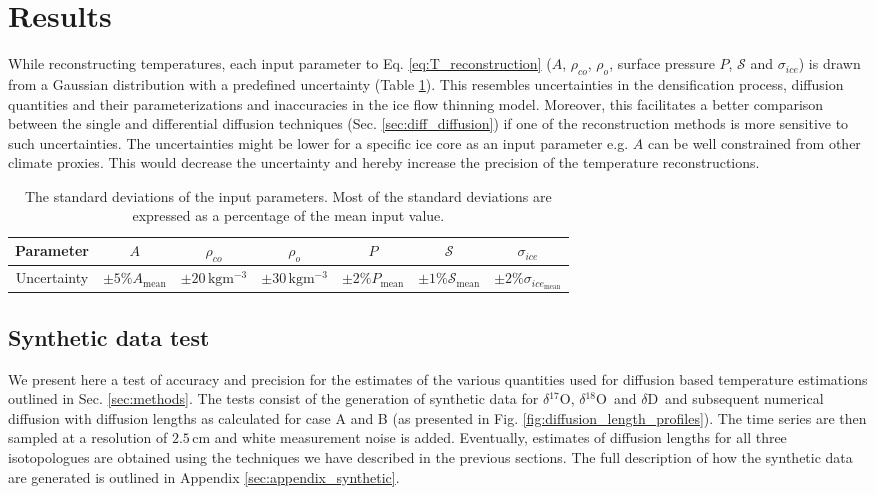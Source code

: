 \documentclass[11pt, draftcls, onecolumn]{IEEEtran} %
\numberwithin{equation}{section}
\numberwithin{table}{section}
\numberwithin{figure}{section}
\newcommand{\delOx}{$\delta{}^{18}\mathrm{O}$}
\newcommand{\delOxb}{$\delta{}^{17}\mathrm{O}$}
\newcommand{\delD}{$\delta\mathrm{D}$}
\begin{document}
\section{Results}\label{sec:results}
While reconstructing temperatures, each input parameter to Eq. \ref{eq:T_reconstruction} 
($A$, $\rho_{co}$, $\rho_o$, surface pressure $P$, $\mathcal{S}$ and $\sigma_{ice}$) is drawn from a Gaussian distribution with a predefined uncertainty (Table \ref{tbl:model_unc}).
This resembles uncertainties in the densification process, diffusion quantities and their parameterizations and inaccuracies in the 
ice flow thinning model.
Moreover, this facilitates a better comparison between the single and differential diffusion techniques (Sec. \ref{sec:diff_diffusion}) 
if one of the reconstruction methods is more sensitive to such uncertainties.
The uncertainties might be lower for a specific ice core as an input parameter e.g. $A$ can be well constrained from other climate proxies.
This would decrease the uncertainty and hereby increase the precision of the temperature reconstructions.


\begin{table}[H]
	\center
	\caption{The standard deviations of the input parameters. 
		Most of the standard deviations are expressed as a percentage of the mean input value.}
	\label{tbl:model_unc}
	\begin{tabular}{c c c c c c c } 
		\toprule
		Parameter & $A$  & $\rho_{co}$  & $\rho_o$  & $P$  & $\mathcal{S}$ & $\sigma_{ice}$ \\
		\midrule
		Uncertainty &	$\pm 5 \% A_\mathrm{mean} $  &  $\pm20 \, \mathrm{kg m^{-3}}$  &  $\pm30 \, \mathrm{kg m^{-3}}$   &    $\pm 2 \% P_\mathrm{mean} $  &     $\pm 1 \% \mathcal{S}_\mathrm{mean} $ 	 & $\pm 2 \% \sigma_{ice_\mathrm{mean}} $ \\
		\bottomrule		
	\end{tabular}
\end{table}

\subsection{Synthetic data test} \label{sec:synthetic_results}
We present here a test of accuracy and precision for the estimates of the various 
quantities used for diffusion based temperature estimations outlined in Sec. \ref{sec:methods}. The tests consist of the generation of
synthetic data for \delOxb, \delOx~and \delD~and subsequent numerical diffusion with diffusion 
lengths as calculated for case A and B (as presented in Fig. \ref{fig:diffusion_length_profiles}).
The time series are then sampled at a resolution of $2.5\,\mathrm{cm}$ and white measurement noise is added. Eventually,
estimates of diffusion lengths for all three isotopologues are obtained using the techniques we have described 
in the previous sections. The full description of how the synthetic data are generated is outlined in Appendix \ref{sec:appendix_synthetic}.
\end{document}
